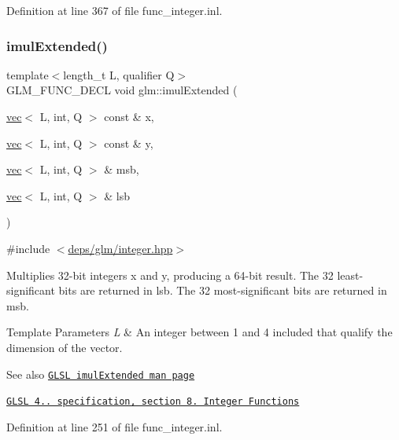 Definition at line 367 of file func\+\_\+integer.\+inl.

\mbox{\label{group__core__func__integer_gac0c510a70e852f57594a9141848642e3}} 
\subsubsection{\texorpdfstring{imul\+Extended()}{imulExtended()}}
{\footnotesize\ttfamily template$<$length\+\_\+t L, qualifier Q$>$ \\
G\+L\+M\+\_\+\+F\+U\+N\+C\+\_\+\+D\+E\+CL void glm\+::imul\+Extended (\begin{DoxyParamCaption}\item[{\hyperlink{structglm_1_1vec}{vec}$<$ L, int, Q $>$ const \&}]{x,  }\item[{\hyperlink{structglm_1_1vec}{vec}$<$ L, int, Q $>$ const \&}]{y,  }\item[{\hyperlink{structglm_1_1vec}{vec}$<$ L, int, Q $>$ \&}]{msb,  }\item[{\hyperlink{structglm_1_1vec}{vec}$<$ L, int, Q $>$ \&}]{lsb }\end{DoxyParamCaption})}



{\ttfamily \#include $<$\hyperlink{integer_8hpp}{deps/glm/integer.\+hpp}$>$}

Multiplies 32-\/bit integers x and y, producing a 64-\/bit result. The 32 least-\/significant bits are returned in lsb. The 32 most-\/significant bits are returned in msb.


\begin{DoxyTemplParams}{Template Parameters}
{\em L} & An integer between 1 and 4 included that qualify the dimension of the vector.\\
\hline
\end{DoxyTemplParams}
\begin{DoxySeeAlso}{See also}
\href{http://www.opengl.org/sdk/docs/manglsl/xhtml/imulExtended.xml}{\tt G\+L\+SL imul\+Extended man page} 

\href{http://www.opengl.org/registry/doc/GLSLangSpec.4.20.8.pdf}{\tt G\+L\+SL 4.. specification, section 8. Integer Functions} 
\end{DoxySeeAlso}


Definition at line 251 of file func\+\_\+integer.\+inl.

